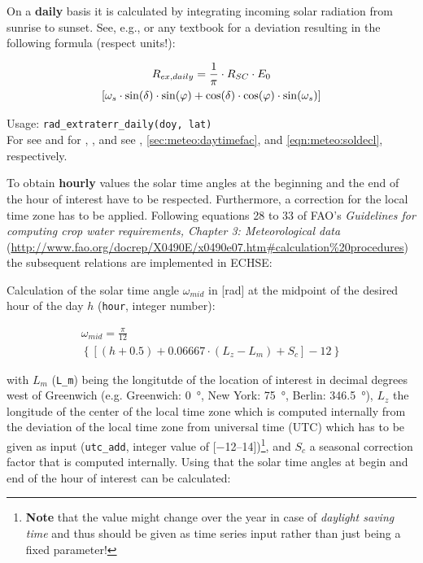 On a \textbf{daily} basis it is calculated by integrating incoming solar radiation from sunrise to sunset. See, e.g., \citet{Neitsch2011} or any textbook for a deviation resulting in the following formula (respect units!):

\begin{multline}\label{eqn:meteo:radex_d}
R_{ex,daily}{} = \frac{1}{\pi} \cdot R_{SC}{} \cdot E_{0}{} \\
\left[ \omega_{s}{} \cdot \sin(\delta{}) \cdot \sin(\varphi{}) + \cos(\delta{}) \cdot \cos(\varphi{}) \cdot \sin(\omega_{s}{}) \right]
\end{multline}

\noindent
Usage:
\verb!rad_extraterr_daily(doy, lat)!\\

For \solarConstant{} see  and for \eccCorr{}, \dayTimeFac{}, and \solDecl{} see , \ref{sec:meteo:daytimefac}, and \ref{eqn:meteo:soldecl}, respectively.

To obtain \textbf{hourly} values the solar time angles at the beginning and the end of the hour of interest have to be respected. Furthermore, a correction for the local time zone has to be applied. Following equations 28 to 33 of FAO's \emph{Guidelines for computing crop water requirements, Chapter 3: Meteorological data} (\url{http://www.fao.org/docrep/X0490E/x0490e07.htm#calculation\%20procedures}) the subsequent relations are implemented in ECHSE:

\noindent
Calculation of the solar time angle $\omega_{mid}$ in [\si{\radian}] at the midpoint of the desired hour of the day $h$ (\verb!hour!, integer number):

\begin{multline}\label{eqn:meteo:radex_h:w_mid}
\omega_{mid} = \frac{\pi}{12} \\
\left\{ \left[ (h + 0.5) + 0.06667 \cdot (L_z - L_m) + S_c \right] - 12 \right\}
\end{multline}

\noindent
with $L_m$ (\verb!L_m!) being the longitutde of the location of interest in decimal degrees west of Greenwich (e.g. Greenwich: \SI{0}{\degree}, New York: \SI{75}{\degree}, Berlin: \SI{346.5}{\degree}), $L_z$ the longitude of the center of the local time zone which is computed internally from the deviation of the local time zone from universal time (UTC) which has to be given as input (\verb!utc_add!, integer value of [\numrange[range-phrase=..]{-12}{14}])\footnote{\textbf{Note} that the value might change over the year in case of \emph{daylight saving time} and thus should be given as time series input rather than just being a fixed parameter!}, and $S_c$ a seasonal correction factor that is computed internally. Using that the solar time angles at begin and end of the hour of interest can be calculated:

